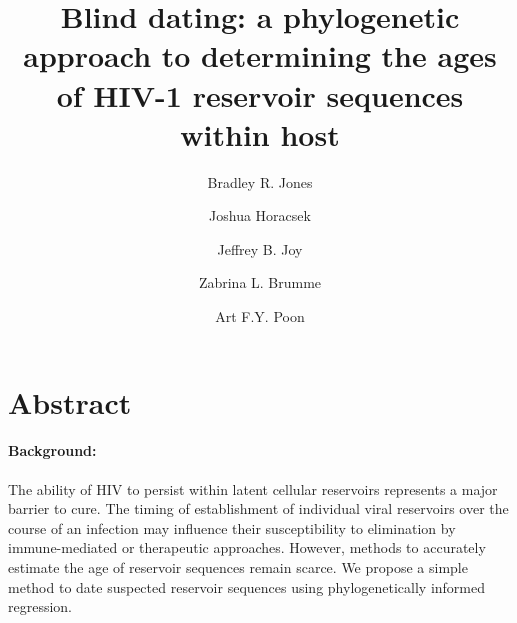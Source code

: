 \documentclass[12pt]{article}
\begin{document}
\title{Blind dating: a phylogenetic approach to determining the ages of HIV-1 reservoir sequences within host}

\author[1,2]{Bradley R. Jones} %
\author[1,2]{Joshua Horacsek} %
\author[2]{Jeffrey B. Joy} %
\author[1,2]{Zabrina L. Brumme} %
\author[1,2,3,*]{Art F.Y. Poon} %

\baselineskip 30pt
\pagewiselinenumbers

\date{}
\maketitle

\section * {Abstract}

\paragraph{Background:}
The ability of HIV to persist within latent cellular reservoirs represents a major barrier to
cure.
The timing of establishment of individual viral reservoirs over the course of an infection may influence their susceptibility to elimination by immune-mediated or therapeutic approaches.
However, methods to accurately estimate the age of reservoir sequences remain scarce.
We propose a simple method to date suspected reservoir sequences using phylogenetically informed regression.

\end{document}
